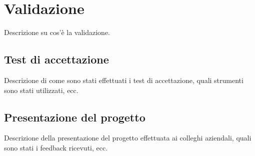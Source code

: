 \section{Validazione}
\label{sez:validazione}

Descrizione su cos'è la validazione.

\subsection{Test di accettazione}
\label{subsec:test-accettazione}

Descrizione di come sono stati effettuati i test di accettazione, quali strumenti sono stati utilizzati, ecc.\\

\subsection{Presentazione del progetto}
\label{subsec:presentazione-progetto}

Descrizione della presentazione del progetto effettuata ai colleghi aziendali, quali sono stati i feedback ricevuti, ecc.\\
